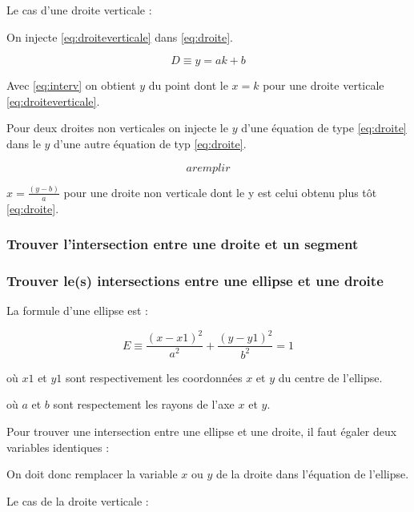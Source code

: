 \documentclass[]{article}
\begin{document}
Le cas d'une droite verticale : 

On injecte \eqref{eq:droiteverticale} dans \eqref{eq:droite}.

\begin{equation} \label{eq:interv}
	D \equiv y = ak + b
\end{equation}

Avec \eqref{eq:interv} on obtient $y$ du point dont le $x = k$
pour une droite verticale \eqref{eq:droiteverticale}.

Pour deux droites non verticales on injecte le $y$ d'une équation
de type \eqref{eq:droite} dans le $y$ d'une autre équation de typ \eqref{eq:droite}.

\begin{equation} \label{eq:internv}
	a remplir
\end{equation}

$ x = \frac {(y - b)}{ a} $ pour une droite non verticale
dont le y est celui obtenu plus tôt \eqref{eq:droite}.

\subsubsection{Trouver l'intersection entre une droite et un segment}

\subsubsection{Trouver le(s) intersections entre une ellipse et une droite}

La formule d'une ellipse est : 

$$ E \equiv \frac{(x - x1)^2}{a^2} + \frac{(y - y1)^2}{b^2} = 1 $$

\begin{description}
\item où $x1$ et $y1$ sont respectivement les coordonnées
$x$ et $y$ du centre de l'ellipse. \\
\item où $a$ et $b$ sont respectement les rayons de l'axe
$x$ et $y$. \\
\end{description}

Pour trouver une intersection entre une ellipse
et une droite, il faut égaler deux variables 
identiques :


On doit donc remplacer la variable $x$ ou $y$ de la droite dans
l'équation de l'ellipse.

Le cas de la droite verticale : 
\end{document}
